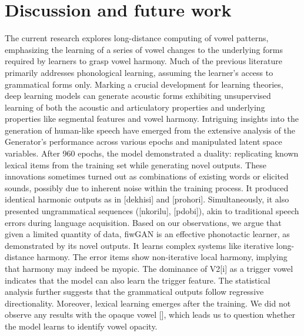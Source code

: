 \documentclass{Interspeech2024}
\begin{document}
\begin{table}[!ht]
 \caption{Linear regression model for machine-generated items}
    \label{tab:my_label}
    \centering
   
\end{table}
\section{Discussion and future work}

The current research explores long-distance computing of vowel patterns, emphasizing the learning of a series of vowel changes to the underlying forms required by learners to grasp vowel harmony. Much of the previous literature primarily addresses phonological learning, assuming the learner's access to grammatical forms only. Marking a crucial development for learning theories, deep learning models can generate acoustic forms exhibiting unsupervised learning of both the acoustic and articulatory properties and underlying properties like segmental features and vowel harmony. Intriguing insights into the generation of human-like speech have emerged from the extensive analysis of the Generator's performance across various epochs and manipulated latent space variables. After 960 epochs, the model demonstrated a duality: replicating known lexical items from the training set while generating novel outputs. These innovations sometimes turned out as combinations of existing words or elicited sounds, possibly due to inherent noise within the training process. It produced identical harmonic outputs as in [dekhisi] and [prohori]. Simultaneously, it also presented ungrammatical sequences ([n\textopeno korilu], [p\textopeno dobi]), akin to traditional speech errors during language acquisition. Based on our observations, we argue that given a limited quantity of data, fiwGAN is an effective phonotactic learner, as demonstrated by its novel outputs. It learns complex systems like iterative long-distance harmony. The error items show non-iterative local harmony, implying that harmony may indeed be myopic. The dominance of V2[i] as a trigger vowel indicates that the model can also learn the trigger feature. The statistical analysis further suggests that the grammatical outputs follow regressive directionality. Moreover, lexical learning emerges after the training. We did not observe any results with the opaque vowel [\textscripta], which leads us to question whether the model learns to identify vowel opacity.







\end{document}
